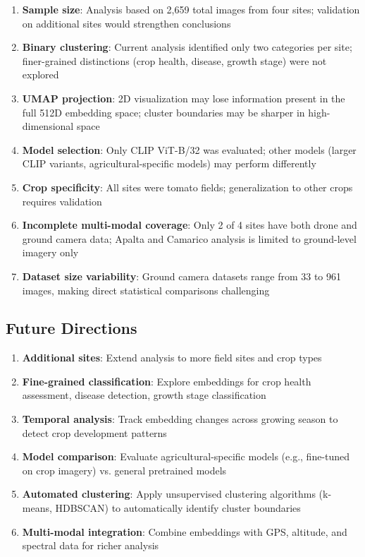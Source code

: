 \begin{enumerate}
    \item \textbf{Sample size}: Analysis based on 2,659 total images from four sites; validation on additional sites would strengthen conclusions

    \item \textbf{Binary clustering}: Current analysis identified only two categories per site; finer-grained distinctions (crop health, disease, growth stage) were not explored

    \item \textbf{UMAP projection}: 2D visualization may lose information present in the full 512D embedding space; cluster boundaries may be sharper in high-dimensional space

    \item \textbf{Model selection}: Only CLIP ViT-B/32 was evaluated; other models (larger CLIP variants, agricultural-specific models) may perform differently

    \item \textbf{Crop specificity}: All sites were tomato fields; generalization to other crops requires validation

    \item \textbf{Incomplete multi-modal coverage}: Only 2 of 4 sites have both drone and ground camera data; Apalta and Camarico analysis is limited to ground-level imagery only

    \item \textbf{Dataset size variability}: Ground camera datasets range from 33 to 961 images, making direct statistical comparisons challenging
\end{enumerate}

\subsection{Future Directions}

\begin{enumerate}
    \item \textbf{Additional sites}: Extend analysis to more field sites and crop types
    \item \textbf{Fine-grained classification}: Explore embeddings for crop health assessment, disease detection, growth stage classification
    \item \textbf{Temporal analysis}: Track embedding changes across growing season to detect crop development patterns
    \item \textbf{Model comparison}: Evaluate agricultural-specific models (e.g., fine-tuned on crop imagery) vs. general pretrained models
    \item \textbf{Automated clustering}: Apply unsupervised clustering algorithms (k-means, HDBSCAN) to automatically identify cluster boundaries
    \item \textbf{Multi-modal integration}: Combine embeddings with GPS, altitude, and spectral data for richer analysis
\end{enumerate}
